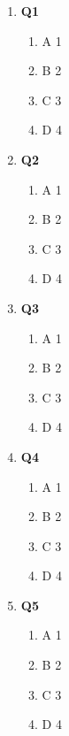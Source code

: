 \documentclass{article}
\begin{document}
\begin{enumerate}
  \item
  \textbf{Q1}
 
  \begin{enumerate}
    \item
	A \hfill 1
    \item
    	B \hfill 2
    \item
    	C \hfill 3
     \item
     	D \hfill 4
  \end{enumerate}

 \item
  \textbf{Q2}

  \begin{enumerate}
    \item
	A \hfill 1
    \item
    	B \hfill 2
    \item
    	C \hfill 3
     \item
     	D \hfill 4
  \end{enumerate}

  \item
  \textbf{Q3}
 
  \begin{enumerate}
    \item
	A \hfill 1
    \item
    	B \hfill 2
    \item
    	C \hfill 3
     \item
     	D \hfill 4
  \end{enumerate}

 \item
  \textbf{Q4}

  \begin{enumerate}
    \item
	A \hfill 1
    \item
    	B \hfill 2
    \item
    	C \hfill 3
     \item
     	D \hfill 4
  \end{enumerate}

  \item
  \textbf{Q5}
 
  \begin{enumerate}
    \item
	A \hfill 1
    \item
    	B \hfill 2
    \item
    	C \hfill 3
     \item
     	D \hfill 4
  \end{enumerate}


\end{enumerate}
\end{document}
